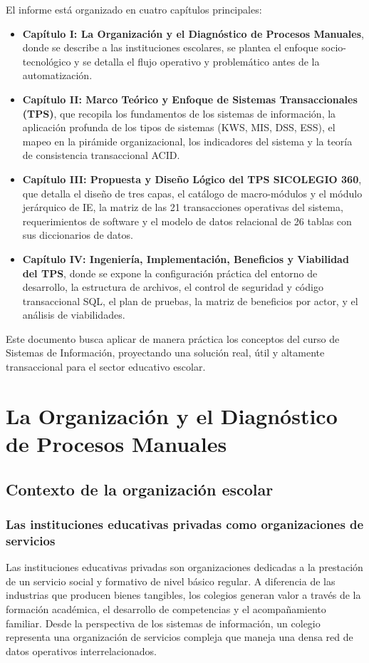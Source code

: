 \documentclass[12pt,a4paper,oneside]{report}
\begin{document}
El informe está organizado en cuatro capítulos principales:
\begin{itemize}
    \item \textbf{Capítulo I: La Organización y el Diagnóstico de Procesos Manuales}, donde se describe a las instituciones escolares, se plantea el enfoque socio-tecnológico y se detalla el flujo operativo y problemático antes de la automatización.
    \item \textbf{Capítulo II: Marco Teórico y Enfoque de Sistemas Transaccionales (TPS)}, que recopila los fundamentos de los sistemas de información, la aplicación profunda de los tipos de sistemas (KWS, MIS, DSS, ESS), el mapeo en la pirámide organizacional, los indicadores del sistema y la teoría de consistencia transaccional ACID.
    \item \textbf{Capítulo III: Propuesta y Diseño Lógico del TPS SICOLEGIO 360}, que detalla el diseño de tres capas, el catálogo de macro-módulos y el módulo jerárquico de IE, la matriz de las 21 transacciones operativas del sistema, requerimientos de software y el modelo de datos relacional de 26 tablas con sus diccionarios de datos.
    \item \textbf{Capítulo IV: Ingeniería, Implementación, Beneficios y Viabilidad del TPS}, donde se expone la configuración práctica del entorno de desarrollo, la estructura de archivos, el control de seguridad y código transaccional SQL, el plan de pruebas, la matriz de beneficios por actor, y el análisis de viabilidades.
\end{itemize}

Este documento busca aplicar de manera práctica los conceptos del curso de Sistemas de Información, proyectando una solución real, útil y altamente transaccional para el sector educativo escolar.

\chapter{La Organización y el Diagnóstico de Procesos Manuales}

\section{Contexto de la organización escolar}

\subsection{Las instituciones educativas privadas como organizaciones de servicios}
Las instituciones educativas privadas son organizaciones dedicadas a la prestación de un servicio social y formativo de nivel básico regular. A diferencia de las industrias que producen bienes tangibles, los colegios generan valor a través de la formación académica, el desarrollo de competencias y el acompañamiento familiar. Desde la perspectiva de los sistemas de información, un colegio representa una organización de servicios compleja que maneja una densa red de datos operativos interrelacionados.
\end{document}
